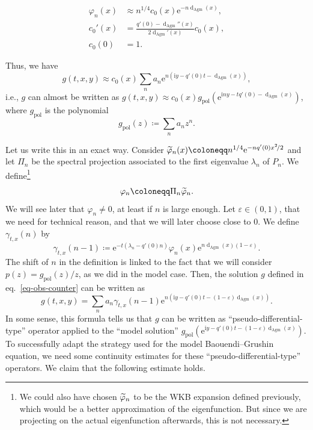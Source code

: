 \documentclass[AHL,Unicode,longabstracts,published]{cedram}
\newcommand{\1}{\mathds 1}
\newcommand{\dagmon}{\mathop{\mathrm{d}}\nolimits_{\mathrm{Agm}}}
\newcommand{\eu}{\mathrm e}
\newcommand{\iu}{\mathrm i}
\newcommand{\pol}{{\mathrm{pol}}}
\newcommand{\g}{\gamma}
\newcommand{\e}{\varepsilon}
\renewcommand{\l}{\lambda}
\newcommand{\f}{\varphi}
\let\oldtilde\tilde
\renewcommand*{\tilde}[1]{\mathchoice{\widetilde{#1}}{\widetilde{#1}}{\oldtilde{#1}}{\oldtilde{#1}}}
\begin{document}
\begin{equation}\label{eq-WKB-selfadjoint}
\begin{split}
\f_n(x) &\approx n^{1/4} c_0(x) \eu^{-n \dagmon(x)},\\
c_0'(x) &= \frac{q'(0) - \dagmon''(x)}{2\dagmon'(x)}c_0(x),\\
c_0(0) &= 1.
\end{split}
\end{equation}

Thus, we have
\begin{equation}\label{eq-obs-counter-approx}
g(t,x,y) \approx c_0(x)\sum_n a_{n} \eu^{n\left(\iu y - q'(0)t - \dagmon(x)\right)},
\end{equation}
i.e., $g$ can almost be written as $g(t,x,y) \approx c_0(x)g_\pol(\eu^{\iu n y -t q'(0) -\dagmon(x)})$, where $g_\pol$ is the polynomial
\[
g_\pol(z) \coloneqq \sum_n a_{n} z^n.
\]

Let us write this in an exact way. Consider $\tilde \f_n(x) \coloneqq n^{1/4} \eu^{-nq'(0)x^2\!/2}$ and let $\Pi_n$ be the spectral projection associated to the first eigenvalue $\l_n$ of $P_n$. We define\footnote{
We could also have chosen $\tilde \f_n$ to be the WKB expansion defined previously, which would be a better approximation of the eigenfunction. But since we are projecting on the actual eigenfunction afterwards, this is not necessary.
}
\begin{equation}\label{eq-def-vn}
\f_n \coloneqq \Pi_n \tilde \f_n.
\end{equation}
We will see later that $\f_n\neq 0$, at least if $n$ is large enough. Let $\e\in (0,1)$, that we need for technical reason, and that we will later choose close to 0. We define $\g_{t,x}(n)$ by
\begin{equation}\label{eq-def-gamma-tx}
\g_{t,x}(n-1) \coloneqq \eu^{-t(\l_n - q'(0)n)} \f_n(x)\eu^{n\dagmon(x)(1-\e)}.
\end{equation}
The shift of $n$ in the definition is linked to the fact that we will consider $p(z) = g_\pol(z)/z$, as we did in the model case. Then, the solution $g$ defined in eq.~\eqref{eq-obs-counter} can be written as
\begin{equation}\label{eq-obs-counter-exact}
g(t,x,y) = \sum_n a_{n} \g_{t,x}(n-1)\eu^{n\left(\iu y - q'(0)t - (1-\e)\dagmon(x)\right)}.
\end{equation}
In some sense, this formula tells us that $g$ can be written as ``pseudo-differential-type'' operator applied to the ``model solution'' $g_\pol(\eu^{\iu y - q'(0)t -(1-\e)\dagmon(x)})$. To successfully adapt the strategy used for the model Baouendi--Grushin equation, we need some continuity estimates for these ``pseudo-differential-type'' operators. We claim that the following estimate holds.
\end{document}
